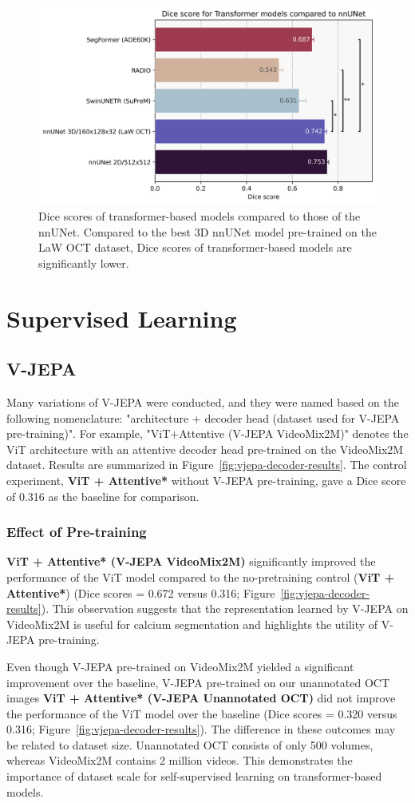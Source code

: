 \documentclass[a4paper,11pt,oneside]{report}
\begin{document}
\begin{figure}[hbt]
    \centering
    \includegraphics[width=0.6\linewidth]{figures/result_nnUNet_vs_Transformer_results.png}
    \caption{Dice scores of transformer-based models compared to those of the nnUNet. Compared to the best 3D nnUNet model pre-trained on the LaW OCT dataset, Dice scores of transformer-based models are significantly lower.}
    \label{fig:transformer-results}
\end{figure}

\section{Supervised Learning}
\subsection{V-JEPA}
Many variations of V-JEPA were conducted, and they were named based on the following nomenclature: "architecture + decoder head (dataset used for V-JEPA pre-training)". For example, "ViT+Attentive (V-JEPA VideoMix2M)" denotes the ViT architecture with an attentive decoder head pre-trained on the VideoMix2M dataset. Results are summarized in Figure~\ref{fig:vjepa-decoder-results}. The control experiment, \textbf{ViT + Attentive*} without V-JEPA pre-training, gave a Dice score of 0.316 as the baseline for comparison. 

\subsubsection{Effect of Pre-training}
\textbf{ViT + Attentive* (V-JEPA VideoMix2M)} significantly improved the performance of the ViT model compared to the no-pretraining control (\textbf{ViT + Attentive*}) (Dice scores = 0.672 versus 0.316; Figure~\ref{fig:vjepa-decoder-results}). This observation suggests that the representation learned by V-JEPA on VideoMix2M is useful for calcium segmentation and highlights the utility of V-JEPA pre-training. 

Even though V-JEPA pre-trained on VideoMix2M yielded a significant improvement over the baseline, V-JEPA pre-trained on our unannotated OCT images \textbf{ViT + Attentive* (V-JEPA Unannotated OCT)} did not improve the performance of the ViT model over the baseline (Dice scores = 0.320 versus 0.316; Figure~\ref{fig:vjepa-decoder-results}). The difference in these outcomes may be related to dataset size. Unannotated OCT consists of only 500 volumes, whereas VideoMix2M contains 2 million videos. This demonstrates the importance of dataset scale for self-supervised learning on transformer-based models.
\end{document}
